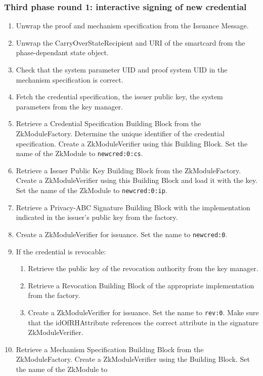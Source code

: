   \subsubsection{Third phase round 1: interactive signing of new credential}
  \begin{enumerate}
  \item Unwrap the proof and mechanism specification from the Issuance Message.
  \item Unwrap the CarryOverStateRecipient and URI of the smartcard from the phase-dependant state object.
  \item Check that the system parameter UID and proof system UID in the mechanism specification is correct.
  \item Fetch the credential specification, the issuer public key, the system parameters from the key manager.
  \item Retrieve a Credential Specification Building Block from the ZkModuleFactory. Determine the unique identifier
    of the credential specification. Create a ZkModuleVerifier using this Building Block. Set the name of the ZkModule to
    \texttt{newcred:0:cs}.
  \item Retrieve a Issuer Public Key Building Block from the ZkModuleFactory.
    Create a ZkModuleVerifier using this Building Block and load it with the key. Set the name of the ZkModule to
    \texttt{newcred:0:ip}.
  \item Retrieve a Privacy-ABC Signature Building Block with the implementation indicated in the issuer's public key from the factory.
  \item Create a ZkModuleVerifier for issuance. Set the name to \texttt{newcred:0}.
  \item If the credential is revocable:
    \begin{enumerate}
      \item Retrieve the public key of the revocation authority from the key manager.
      \item Retrieve a Revocation Building Block of the appropriate implementation from the factory.
      \item Create a ZkModuleVerifier for issuance. Set the name to \texttt{rev:0}. Make sure that the idOfRHAttribute
        references the correct attribute in the signature ZkModuleVerifier.
    \end{enumerate}
  \item Retrieve a Mechanism Specification Building Block from the ZkModuleFactory.
  Create a ZkModuleVerifier using the Building Block. Set the name of the ZkModule to

\end{enumerate}
